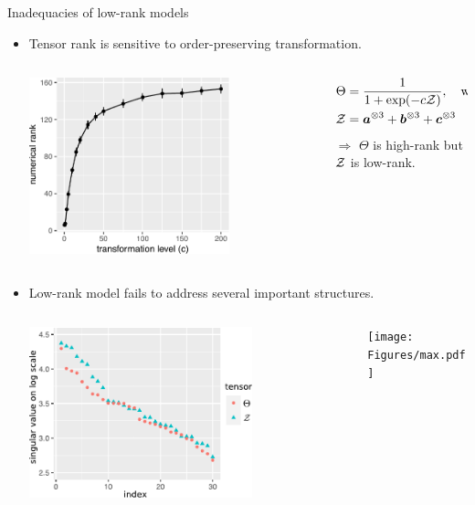 \documentclass[10pt, mathserif]{beamer} %
\theoremstyle{definition}
\theoremstyle{plain}
\begin{document}
\begin{frame}{Inadequacies of  low-rank models}
 \begin{itemize}         
  \item Tensor rank is sensitive to order-preserving transformation.
\begin{columns}
\begin{column}{0.5\textwidth}
   \begin{center}
     \includegraphics[width=0.7\textwidth]{Figures/example1.pdf}
     \end{center}
\end{column}
\begin{column}{0.6\textwidth} 
\begin{align}
\Theta &= {1\over 1+\exp(-c\mathcal{Z})},\quad\text{where }\\ 
\mathcal{Z} &= \bm a^{\otimes3}+ \bm b^{\otimes3}+ \bm c^{\otimes3}
\end{align}
$\Rightarrow$ $\Theta$ is high-rank but $\mathcal{Z}$ is low-rank. 
\end{column}
\end{columns}
      
   \pause   
   
 \item Low-rank model fails to address several important structures.
 \begin{columns}
\begin{column}{0.55\textwidth}
   \begin{center}
     \includegraphics[width=0.7\textwidth]{Figures/example2.pdf}
     \end{center}
\end{column}
\begin{column}{0.6\textwidth}  
\texttt{[image: Figures/max.pdf]}


\end{column}
\end{columns}
\end{itemize}
\end{frame}
\end{document}
